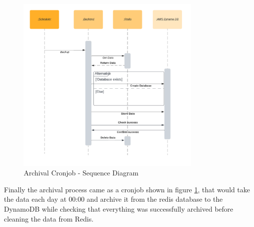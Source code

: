 \begin{figure}[!htb]
    \centering
    \includegraphics[width=0.8\textwidth]{images/archival_backup.png} 
    \caption{\footnotesize{Archival Cronjob - Sequence Diagram}}
    \label{fig:archival_backup}
\end{figure}

Finally the archival process came as a cronjob shown in figure \ref{fig:archival_backup},
that would take the data each day at 00:00 and archive it from the redis database to the
DynamoDB while checking that everything was successfully archived before cleaning the data
from Redis.


